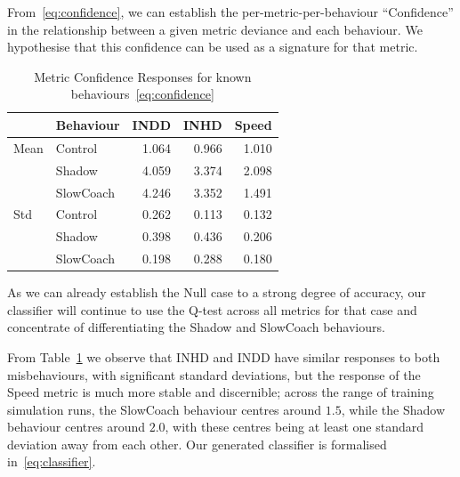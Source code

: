\documentclass[conference,compsoc,letterpaper]{IEEEtran}
\begin{document}
From~\eqref{eq:confidence}, we can establish the per-metric-per-behaviour ``Confidence'' in the relationship between a given metric deviance and each behaviour. We hypothesise that this confidence can be used as a signature for that metric.

\begin{table}[h]
  \caption{Metric Confidence Responses for known behaviours~\eqref{eq:confidence}}
  \centering
\begin{tabular}{llrrr}
\toprule
{} & Behaviour &  INDD &  INHD &  Speed \\
\midrule
Mean & Control & 1.064 & 0.966 &  1.010 \\
     & Shadow & 4.059 & 3.374 &  2.098 \\
     & SlowCoach & 4.246 & 3.352 &  1.491 \\
Std & Control & 0.262 & 0.113 &  0.132 \\
     & Shadow & 0.398 & 0.436 &  0.206 \\
     & SlowCoach & 0.198 & 0.288 &  0.180 \\
\bottomrule
\end{tabular}
  \label{tab:confidence}
\end{table}

As we can already establish the Null case to a strong degree of accuracy, our classifier will continue to use the Q-test across all metrics for that case and concentrate of differentiating the Shadow and SlowCoach behaviours. 

From Table~\ref{tab:confidence} we observe that INHD and INDD have similar responses to both misbehaviours, with significant standard deviations, but the response of the Speed metric is much more stable and discernible; across the range of training simulation runs, the SlowCoach behaviour centres around $1.5$, while the Shadow behaviour centres around $2.0$, with these centres being at least one standard deviation away from each other.
Our generated classifier is formalised in~\eqref{eq:classifier}.
\end{document}
